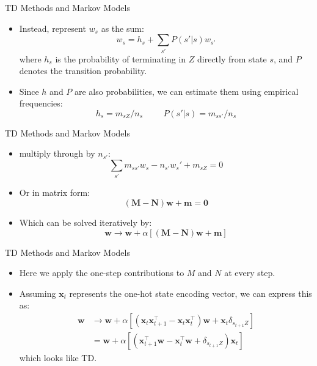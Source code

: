 \documentclass{beamer}
\renewcommand{\vec}[1]{\mathbf{#1}}
\begin{document}
\begin{frame}{TD Methods and Markov Models}
  \begin{itemize}
  \item<1-> Instead, represent $w_s$ as the sum:
  \[w_s = h_s + \sum_{s'}P(s'|s)w_{s'}\]
  where $h_s$ is the probability of terminating in $Z$ directly from state $s$, and $P$ denotes the transition probability.
  \item<2-> Since $h$ and $P$ are also probabilities, we can estimate them using empirical frequencies:
  \[
    h_s = m_{sZ}/n_s \hspace{1cm} P(s'|s) = m_{ss'}/n_s
  \]
\end{itemize}
\end{frame}


\begin{frame}{TD Methods and Markov Models}
  \begin{itemize}
  \item<1-> multiply through by $n_{s'}$:\[\sum_{s'}m_{ss'}w_s -  n_{s'}w_s' + m_{sZ} = 0\]
  \item<2-> Or in matrix form: \[(\vec{M} - \vec{N})\vec{w} + \vec{m} = \vec{0}\]
  \item<3-> Which can be solved iteratively by:
  \[\vec{w} \to \vec{w} + \alpha\left[(\vec{M} - \vec{N})\vec{w} + \vec{m}\right]\]
\end{itemize}
\end{frame}
\begin{frame}{TD Methods and Markov Models}
  \begin{itemize}
  \item<1-> Here we apply the one-step contributions to $M$ and $N$ at every step.
  \item<2-> Assuming $\vec{x}_t$ represents the one-hot state encoding vector, we can express this as: 
  \begin{align}\vec{w} &\to \vec{w} + \alpha\left[(\vec{x}_t\vec{x}_{t+1}^{\top} - \vec{x}_t\vec{x}_{t}^{\top})\vec{w} + \vec{x}_t\delta_{s_{t+1}Z}\right]\\
  &=\vec{w} + \alpha\left[(\vec{x}_{t+1}^{\top}\vec{w} - \vec{x}_{t}^{\top}\vec{w} + \delta_{s_{t+1}Z})\vec{x}_t\right]
  \end{align}
  which looks like TD.
\end{itemize}
\end{frame}
\end{document}
